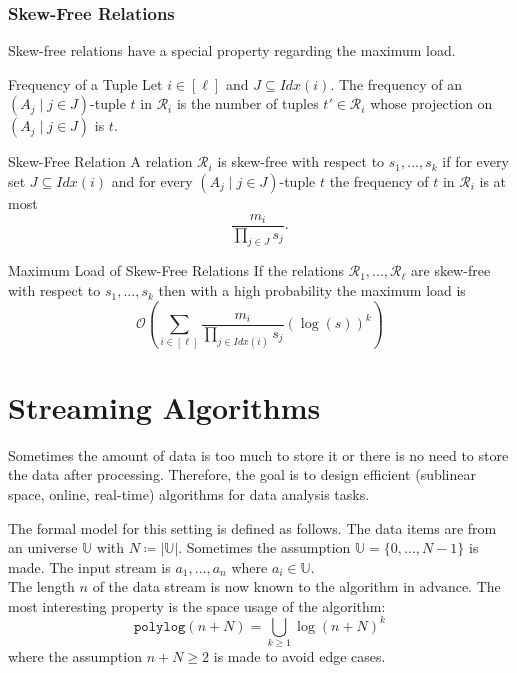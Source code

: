 \documentclass[english]{panikzettel}
\begin{document}
\subsubsection{Skew-Free Relations}
Skew-free relations have a special property regarding the maximum load.

\begin{defi}{Frequency of a Tuple}
Let $i\in[\ell]$ and $J\subseteq Idx(i)$. The frequency of an $(A_j\mid j\in J)$-tuple $t$ in $\mathcal{R}_i$ is the number of tuples $t'\in\mathcal{R}_i$ whose projection on $(A_j\mid j\in J)$ is $t$.
\end{defi}

\begin{halfboxl}
\vspace{-\baselineskip}
	\begin{defi}{Skew-Free Relation}
	A relation $\mathcal{R}_i$ is skew-free with respect to $s_1,...,s_k$ if for every set $J\subseteq Idx(i)$ and for every $(A_j \mid j\in J)$-tuple $t$ the frequency of $t$ in $\mathcal{R}_i$ is at most
	\[
	\frac{m_i}{\prod_{j\in J}s_j}.
	\]
	\end{defi}
\end{halfboxl}
\begin{halfboxr}
\vspace{-\baselineskip}
	\begin{theo}{Maximum Load of Skew-Free Relations}
	If the relations $\mathcal{R}_1,...,\mathcal{R}_\ell$ are skew-free with respect to $s_1,...,s_k$ then with a high probability the maximum load is
	\[
	\mathcal{O}\left(\sum_{i\in [\ell]} \frac{m_i}{\prod_{j\in Idx(i)} s_j}(\log(s))^k \right)
	\]
	\end{theo}
\end{halfboxr}


\section{Streaming Algorithms}
Sometimes the amount of data is too much to store it or there is no need to store the data after processing. Therefore, the goal is to design efficient (sublinear space, online, real-time) algorithms for data analysis tasks.

The formal model for this setting is defined as follows. The data items are from an universe $\mathbb{U}$ with $N\coloneqq |\mathbb{U}|$. Sometimes the assumption $\mathbb{U}=\{0,\ldots, N-1 \}$ is made. The input stream is $a_1,...,a_n$ where $a_i\in \mathbb{U}$.\\
The length $n$ of the data stream is now known to the algorithm in advance. The most interesting property is the space usage of the algorithm:
\[
\texttt{polylog}(n+N)=\underset{k\geq 1}{\bigcup} \log (n+N)^k
\]
where the assumption $n+N\geq 2$ is made to avoid edge cases.
\end{document}
